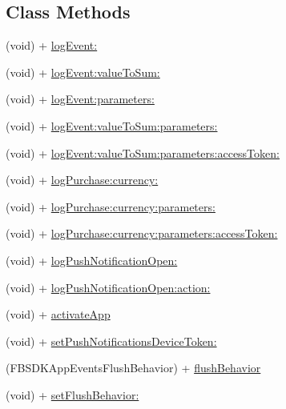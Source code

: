 \subsection*{Class Methods}
\begin{DoxyCompactItemize}
\item 
(void) + \hyperlink{interface_f_b_s_d_k_app_events_ab605cd80f86427aff7c1f8aabc7c66d5}{log\+Event\+:}
\item 
(void) + \hyperlink{interface_f_b_s_d_k_app_events_a58667a5b1a2d4afc624234221c95462b}{log\+Event\+:value\+To\+Sum\+:}
\item 
(void) + \hyperlink{interface_f_b_s_d_k_app_events_a92bd8932c1fc897b728fd4c4b07de08b}{log\+Event\+:parameters\+:}
\item 
(void) + \hyperlink{interface_f_b_s_d_k_app_events_aeefb69a9e678b9ffc9796a54eea8f1bd}{log\+Event\+:value\+To\+Sum\+:parameters\+:}
\item 
(void) + \hyperlink{interface_f_b_s_d_k_app_events_abbb2eb0ff301d10b128c1fedf035b8aa}{log\+Event\+:value\+To\+Sum\+:parameters\+:access\+Token\+:}
\item 
(void) + \hyperlink{interface_f_b_s_d_k_app_events_a57cc5c84810c0242b579d461cc5378dc}{log\+Purchase\+:currency\+:}
\item 
(void) + \hyperlink{interface_f_b_s_d_k_app_events_a4412a8f55bd2c0e9d0e7bcc4289002b5}{log\+Purchase\+:currency\+:parameters\+:}
\item 
(void) + \hyperlink{interface_f_b_s_d_k_app_events_a00c308db422bdf184e6abbcf6a809ce5}{log\+Purchase\+:currency\+:parameters\+:access\+Token\+:}
\item 
(void) + \hyperlink{interface_f_b_s_d_k_app_events_a8d4ec969724b74939125c5bf7a0b57e7}{log\+Push\+Notification\+Open\+:}
\item 
(void) + \hyperlink{interface_f_b_s_d_k_app_events_aebac7a95cc7e1a0f0754406020e3d3cb}{log\+Push\+Notification\+Open\+:action\+:}
\item 
(void) + \hyperlink{interface_f_b_s_d_k_app_events_a4846c87fc0de72102972b2a78fbdeb09}{activate\+App}
\item 
(void) + \hyperlink{interface_f_b_s_d_k_app_events_ade01592e9be4832ce859d1d3b1f245f5}{set\+Push\+Notifications\+Device\+Token\+:}
\item 
(F\+B\+S\+D\+K\+App\+Events\+Flush\+Behavior) + \hyperlink{interface_f_b_s_d_k_app_events_a938b71bde76d5c02599778243d1e92e7}{flush\+Behavior}
\item 
(void) + \hyperlink{interface_f_b_s_d_k_app_events_ab5a903bcfe1f5bfa633cc9b202138fdc}{set\+Flush\+Behavior\+:}

\end{DoxyCompactItemize}
